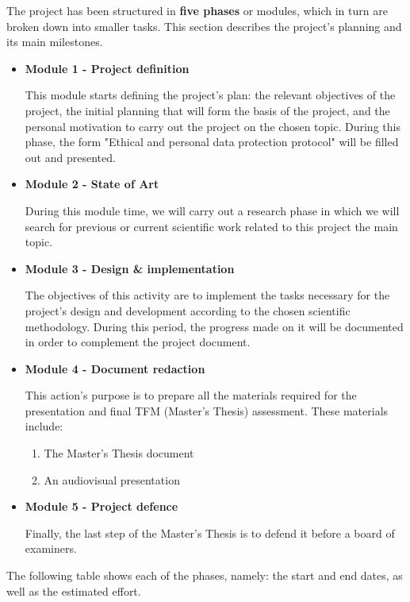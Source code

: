 The project has been structured in \textbf{five phases} or modules, which in turn are broken down into smaller tasks. This section describes the project's planning and its main milestones. 
\begin{itemize}
    \item \textbf{Module 1 - Project definition} 
    
    This module starts defining the project's plan: the relevant objectives of the project, the initial planning that will form the basis of the project, and the personal motivation to carry out the project on the chosen topic. During this phase, the form "Ethical and personal data protection protocol" will be filled out and presented.
    \item \textbf{Module 2 - State of Art}
    
    During this module time, we will carry out a research phase in which we will search for previous or current scientific work related to this project the main topic. 
    \item \textbf{Module 3 - Design \& implementation}
    
    The objectives of this activity are to implement the tasks necessary for the project's design and development according to the chosen scientific methodology. During this period, the progress made on it will be documented in order to complement the project document. 
    \item \textbf{Module 4 - Document redaction}
    
    This action's purpose is to prepare all the materials required for the presentation and final TFM (Master's Thesis) assessment. These materials include:
    
    \begin{enumerate}
        \item The Master's Thesis document
        \item An audiovisual presentation
    \end{enumerate}

    \item \textbf{Module 5 - Project defence}
    
    Finally, the last step of the Master's Thesis is to defend it before a board of examiners.
\end{itemize}

The following table shows each of the phases, namely: the start and end dates, as well as the estimated effort.



